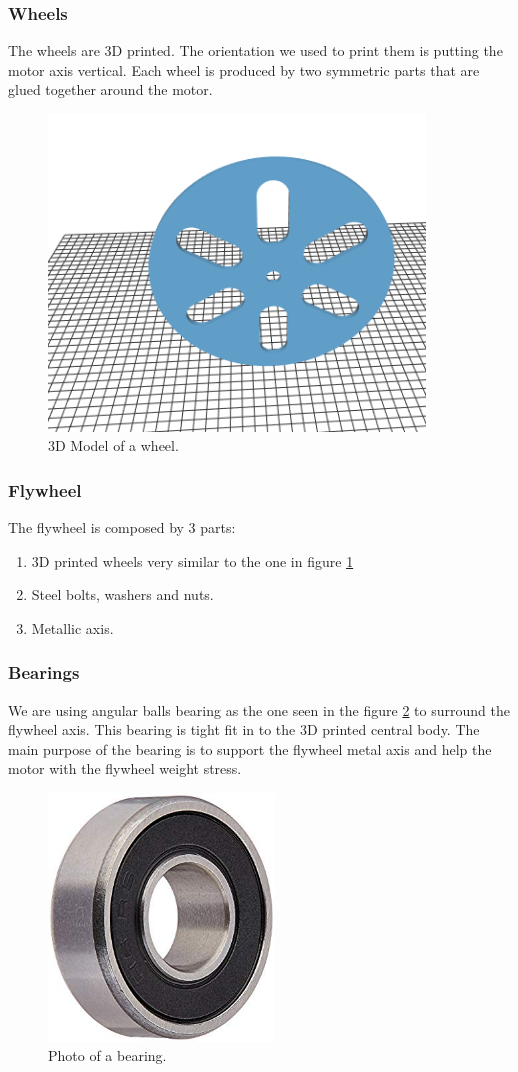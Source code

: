 \subsubsection{Wheels}
The wheels are 3D printed. The orientation we used to print them
is putting the motor axis vertical. Each wheel is produced by two
symmetric parts that are glued together around the motor.
\begin{figure}[H]
    \centering
    \includegraphics[width=10cm]{img/components/wheel.png}
    \caption{3D Model of a wheel.}
    \label{fig: 3D wheel}
\end{figure}
\subsubsection{Flywheel}
The flywheel is composed by 3 parts:
\begin{enumerate}
    \item 3D printed wheels very similar to the one in figure \ref{fig: 3D wheel}
    \item Steel bolts, washers and nuts.
    \item Metallic axis.
\end{enumerate}
\subsubsection{Bearings}
We are using angular balls bearing as the one seen in the figure
\ref{fig: photo bearing} to surround the flywheel axis. This bearing is
tight fit in to the 3D printed central body. The main purpose of the bearing
is to support the flywheel metal axis and help the motor with the flywheel weight
stress.
\begin{figure}[H]
    \centering
    \includegraphics[width=6cm]{img/bearing.jpg}
    \caption{Photo of a bearing.}
    \label{fig: photo bearing}
\end{figure}
